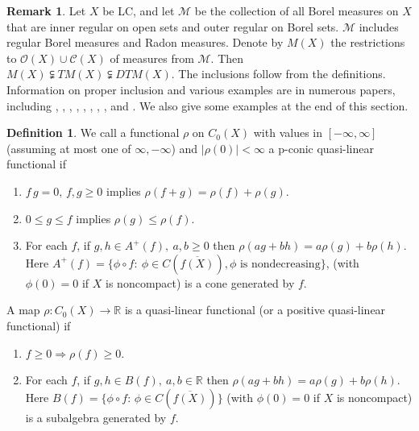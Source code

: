 \documentclass[sn-mathphys-num]{sn-jnl}%
\theoremstyle{thmstyleone}%
\theoremstyle{definition}
\newtheorem{definition}[theorem]{Definition}
\newtheorem{remark}[theorem]{Remark}
\begin{document}
\begin{remark} \label{Vloz}
Let $X$ be LC, and let $ \mathscr{M}$  be the collection of all Borel measures on $X$ that are inner regular on open sets and outer regular 
on Borel sets.  $  \mathscr{M}$ includes regular Borel measures and Radon measures. 
Denote by $M(X)$ the restrictions to $\mathscr{O}(X) \cup \mathscr{C}(X)$ of measures from $ \mathscr{M}$.
Then
 $M(X) \subsetneqq  TM(X)  \subsetneqq  DTM(X).$
The inclusions follow from the definitions. 
Information on proper inclusion
and various examples are in numerous papers, including
\cite{Aarnes:TheFirstPaper}, \cite{AarnesRustad},  \cite{QfunctionsEtm}, \cite{OrjanAlf:CostrPropQlf},   \cite {Svistula:Signed},  \cite{Svistula:DTM},
\cite{Butler:TechniqLC}, \cite{Butler:DTMLC}, and \cite{Butler:TMLCconstr}.
We also give some examples at the end of this section. 
\end{remark}

\begin{definition} \label{cqlf}
We call a  functional $\rho$ on $C_0(X)$  with values in $[ -\infty, \infty]$ (assuming at most one of $\infty, - \infty$) 
and $| \rho(0) | < \infty$ a p-conic quasi-linear functional if 
\begin{enumerate}[leftmargin=0.35in, label=(p\arabic*),ref=(p\arabic*)]
\item
$f\, g=0, \, f, g  \ge 0$ implies $ \rho(f+ g) = \rho(f) + \rho(g)$.
\item
 $0 \le g \le f$ implies $\rho(g) \le \rho(f)$.
\item
For each $f$, if $g,h \in A^+(f), \ a,b \ge 0$ then $\rho(a g + bh) = a \rho(g) + b \rho(h)$.
Here $ A^+(f) = \{ \phi \circ f: \ \phi \in C(\overline{f(X)}), \phi  \mbox{   is nondecreasing}\} $, (with $ \phi(0) = 0 $ 
if $X$ is noncompact) is a cone generated by $f$.
\end{enumerate}

\noindent
A map $\rho:C_0(X) \longrightarrow \mathbb{R}$
is a quasi-linear functional (or a positive quasi-linear functional) if 
\begin{enumerate}[leftmargin=0.25in, label=(\alph*),ref=(\alph*)]
\item \label{QIpositLC}
$ f \ge 0 \Longrightarrow \rho(f)  \ge 0.$
\item \label{QIlinLC}
For each  $f $,   if $g,h \in B(f),  \ a,b \in \mathbb{R}$ then $\rho(a g + bh) = a \rho(g) + b \rho(h)$.
Here  $B(f) =  \{ \phi \circ f : \,  \phi \in C(\overline{f(X)}) \} $  (with $ \phi(0) = 0 $ if $X$ is noncompact) is a subalgebra generated by $f$. 
\end{enumerate}
\end{definition}
\end{document}

